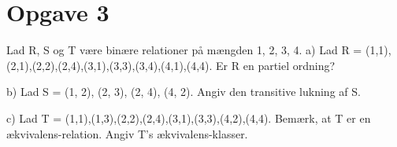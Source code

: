 \section{Opgave 3}

Lad R, S og T være binære relationer på mængden {1, 2, 3, 4}.
a) Lad R = {(1,1),(2,1),(2,2),(2,4),(3,1),(3,3),(3,4),(4,1),(4,4)}.
Er R en partiel ordning?

b) Lad S = {(1, 2), (2, 3), (2, 4), (4, 2)}.
Angiv den transitive lukning af S.

c) Lad T = {(1,1),(1,3),(2,2),(2,4),(3,1),(3,3),(4,2),(4,4)}.
Bemærk, at T er en ækvivalens-relation. Angiv T's ækvivalens-klasser.
